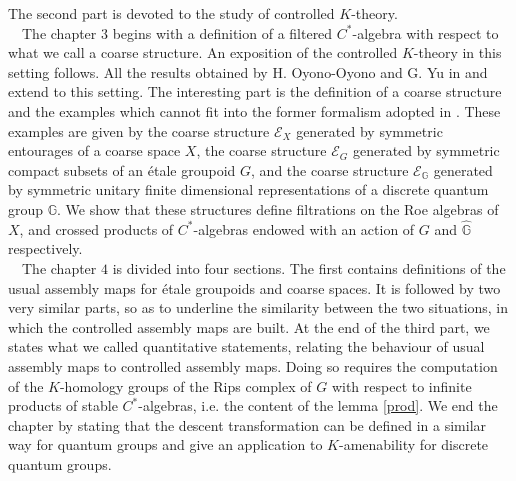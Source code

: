 The second part is devoted to the study of controlled $K$-theory. \\

\ \ The chapter $3$ begins with a definition of a filtered $C^*$-algebra with respect to what we call a coarse structure. An exposition of the controlled $K$-theory in this setting follows. All the results obtained by H. Oyono-Oyono and G. Yu in \cite{OY2} and \cite{OY3} extend to this setting. The interesting part is the definition of a coarse structure and the examples which cannot fit into the former formalism adopted in \cite{OY2}. These examples are given by the coarse structure $\mathcal E_X$ generated by symmetric entourages of a coarse space $X$, the coarse structure $\mathcal E_G$ generated by symmetric compact subsets of an étale groupoid $G$, and the coarse structure $\mathcal E_{\mathbb G}$ generated by symmetric unitary finite dimensional representations of a discrete quantum group $\mathbb G$. We show that these structures define filtrations on the Roe algebras of $X$, and crossed products of $C^*$-algebras endowed with an action of $G$ and $\hat{\mathbb G}$ respectively.\\

\ \ The chapter $4$ is divided into four sections. The first contains definitions of the usual assembly maps for étale groupoids and coarse spaces. It is followed by two very similar parts, so as to underline the similarity between the two situations, in which the controlled assembly maps are built. %
At the end of the third part, we states what we called quantitative statements, relating the behaviour of usual assembly maps to controlled assembly maps. Doing so requires the computation of the $K$-homology groups of the Rips complex of $G$ with respect to infinite products of stable $C^*$-algebras, i.e. the content of the lemma \ref{prod}. We end the chapter by stating that the descent transformation can be defined in a similar way for quantum groups and give an application to $K$-amenability for discrete quantum groups.\\

